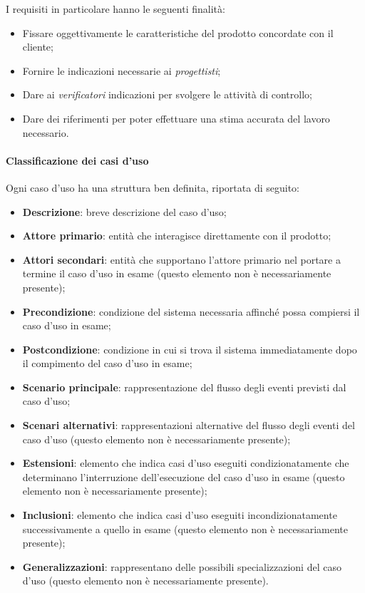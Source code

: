 I requisiti in particolare hanno le seguenti finalità:
\begin{itemize}
    \item Fissare oggettivamente le caratteristiche del prodotto concordate con il cliente;
    \item Fornire le indicazioni necessarie ai \emph{progettisti};
    \item Dare ai \emph{verificatori} indicazioni per svolgere le attività di controllo;
    \item Dare dei riferimenti per poter effettuare una stima accurata del lavoro necessario.
\end{itemize}

\paragraph{Classificazione dei casi d'uso}
\label{par:classificazione_casi_duso}

Ogni caso d'uso ha una struttura ben definita, riportata di seguito:
\begin{itemize}
    \item \textbf{Descrizione}: breve descrizione del caso d'uso;
    \item \textbf{Attore primario}: entità che interagisce direttamente con il prodotto;
    \item \textbf{Attori secondari}: entità che supportano l'attore primario nel portare a termine il caso d'uso in 
    	esame (questo elemento non è necessariamente presente);
    \item \textbf{Precondizione}: condizione del sistema necessaria affinché possa compiersi il caso d'uso in esame;
    \item \textbf{Postcondizione}: condizione in cui si trova il sistema immediatamente dopo il compimento del caso 
    d'uso in esame;
    \item \textbf{Scenario principale}: rappresentazione del flusso degli eventi previsti dal caso d'uso;
    \item \textbf{Scenari alternativi}: rappresentazioni alternative del flusso degli eventi del caso d'uso (questo 
    	elemento non è necessariamente presente);
    \item \textbf{Estensioni}: elemento che indica casi d'uso eseguiti condizionatamente che determinano l'interruzione 
    	dell'esecuzione del caso d'uso in esame (questo elemento non è necessariamente presente);
    \item \textbf{Inclusioni}: elemento che indica casi d'uso eseguiti incondizionatamente successivamente a quello in 
    	esame (questo elemento non è necessariamente presente);
    \item \textbf{Generalizzazioni}: rappresentano delle possibili specializzazioni del caso d'uso (questo elemento non è necessariamente 
    	presente).
\end{itemize}

